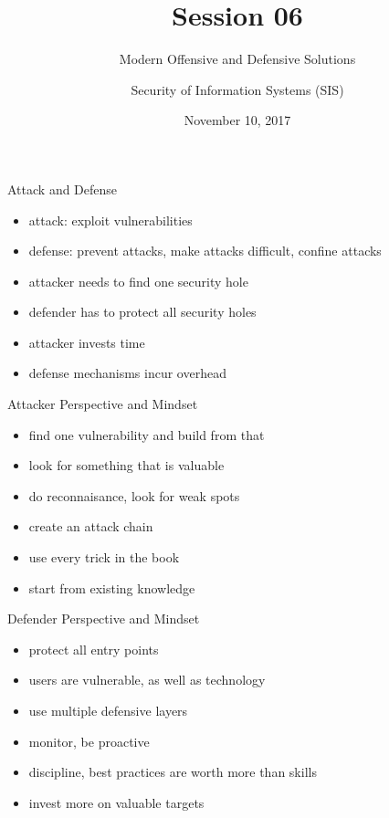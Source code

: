 \documentclass{curs}
\title[Session 06]{Session 06}
\subtitle{Modern Offensive and Defensive Solutions}
\author{Security of Information Systems (SIS)}
\date{November 10, 2017}
\begin{document}
\frame{\titlepage}

\begin{frame}{Attack and Defense}
  \begin{itemize}
    \item attack: exploit vulnerabilities
    \item defense: prevent attacks, make attacks difficult, confine attacks
    \item attacker needs to find one security hole
    \item defender has to protect all security holes
    \item attacker invests time
    \item defense mechanisms incur overhead
  \end{itemize}
\end{frame}

\begin{frame}{Attacker Perspective and Mindset}
  \begin{itemize}
    \item find one vulnerability and build from that
    \item look for something that is valuable
    \item do reconnaisance, look for weak spots
    \item create an attack chain
    \item use every trick in the book
    \item start from existing knowledge
  \end{itemize}
\end{frame}

\begin{frame}{Defender Perspective and Mindset}
  \begin{itemize}
    \item protect all entry points
    \item users are vulnerable, as well as technology
    \item use multiple defensive layers
    \item monitor, be proactive
    \item discipline, best practices are worth more than skills
    \item invest more on valuable targets
  \end{itemize}
\end{frame}
\end{document}
